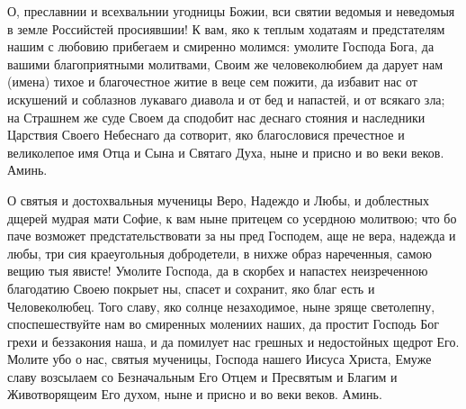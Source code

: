 \begin{mymulticols}



О, преславнии и всехвальнии угодницы Божии, вси святии ведомыя и неведомыя в земле Российстей просиявшии! К вам, яко к теплым ходатаям и предстателям нашим с любовию прибегаем и смиренно молимся: умолите Господа Бога, да вашими благоприятными молитвами, Своим же человеколюбием да дарует нам (имена) тихое и благочестное житие в веце сем пожити, да избавит нас от искушений и соблазнов лукаваго диавола и от бед и напастей, и от всякаго зла; на Страшнем же суде Своем да сподобит нас деснаго стояния и наследники Царствия Своего Небеснаго да сотворит, яко благословися пречестное и великолепое имя Отца и Сына и Святаго Духа, ныне и присно и во веки веков. Аминь.

\end{mymulticols}

\mychapterending


\begin{mymulticols}



О святыя и достохвальныя мученицы Веро, Надеждо и Любы, и доблестных дщерей мудрая мати Софие, к вам ныне притецем со усердною молитвою; что бо паче возможет предстательствовати за ны пред Господем, аще не вера, надежда и любы, три сия краеугольныя добродетели, в нихже образ нареченныя, самою вещию тыя явисте! Умолите Господа, да в скорбех и напастех неизреченною благодатию Своею покрыет ны, спасет и сохранит, яко благ есть и Человеколюбец. Того славу, яко солнце незаходимое, ныне зряще светолепну, споспешествуйте нам во смиренных молениих наших, да простит Господь Бог грехи и беззакония наша, и да помилует нас грешных и недостойных щедрот Его. Молите убо о нас, святыя мученицы, Господа нашего Иисуса Христа, Емуже славу возсылаем со Безначальным Его Отцем и Пресвятым и Благим и Животворящеим Его духом, ныне и присно и во веки веков. Аминь.

\end{mymulticols}

\mychapterending


